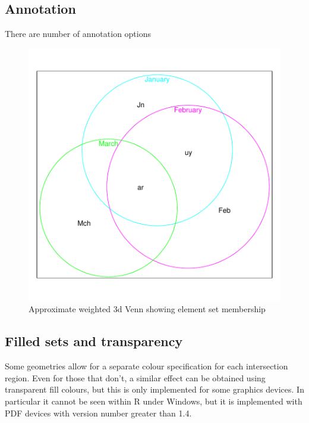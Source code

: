 \documentclass[a4paper]{article}
\begin{document}
\subsection{Annotation}
There are  number of annotation options

\begin{figure}[H]
  \begin{center}
\includegraphics{Vennfig-pv3winn}
\caption{Approximate weighted 3d Venn showing element set membership}
\end{center}\end{figure}


\subsection{Filled sets and transparency}

Some geometries allow for a separate colour specification for 
each intersection region. Even for those that don't, a similar effect
can be obtained using transparent fill colours, but this is only implemented
for some graphics devices. In particular it cannot be seen within R under Windows,
but it is implemented with PDF devices with version number greater than 1.4.
\end{document}
